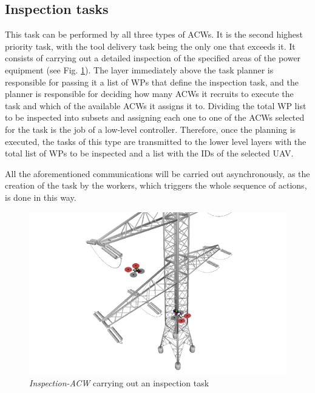 \subsection{Inspection tasks}
\label{subsec:InspectionTasks}
This task can be performed by all three types of \glspl{ACW}. It is the second highest priority task, with the tool delivery task being the only one that exceeds it. It consists of carrying out a detailed inspection of the specified areas of the power equipment (see Fig. \ref{fig:inspection_task}). The layer immediately above the task planner is responsible for passing it a list of \glspl{WP} that define the inspection task, and the planner is responsible for deciding how many \glspl{ACW} it recruits to execute the task and which of the available \glspl{ACW} it assigns it to. Dividing the total \gls{WP} list to be inspected into subsets and assigning each one to one of the \glspl{ACW} selected for the task is the job of a low-level controller. Therefore, once the planning is executed, the tasks of this type are transmitted to the lower level layers with the total list of \glspl{WP} to be inspected and a list with the \glspl{ID} of the selected \gls{UAV}.

All the aforementioned communications will be carried out asynchronously, as the creation of the task by the workers, which triggers the whole sequence of actions, is done in this way.

\begin{figure}[htbp]
    \centering
    \includegraphics[width=.75\linewidth]
    {ProblemFormulation/figures/inspection_task.pdf}
    \caption{\textit{Inspection-ACW} carrying out an inspection task}
    \label{fig:inspection_task}
\end{figure}

